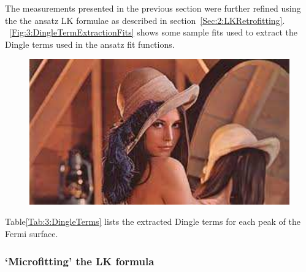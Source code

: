 The measurements presented in the previous section were further refined using the the ansatz LK formulae as described in section~\ref{Sec:2:LKRetrofitting}. \Fig~\ref{Fig:3:DingleTermExtractionFits} shows some sample fits used to extract the Dingle terms used in the ansatz fit functions.
\begin{figure}[h!]
    \begin{center}
        \includegraphics[scale=0.7]{Misc/TODO}
        \caption{}
        \label{Fig:3:RetrofittedLKFits}
    \end{center}
\end{figure}
Table\ref{Tab:3:DingleTerms} lists the extracted Dingle terms for each peak of the Fermi surface.

\subsubsection{`Microfitting' the LK formula}

